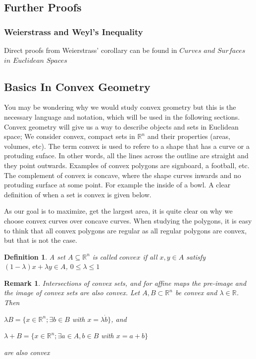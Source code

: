 \documentclass[a4paper]{book}
\newtheorem{remark}{Remark}%
\newtheorem{definition}{Definition}%
\begin{document}
\subsection{Further Proofs}
\subsubsection{Weierstrass and Weyl's Inequality}
Direct proofs from Weierstrass' corollary can be found in $Curves$ $and$ $Surfaces$ $in$ $Euclidean$ $Spaces$~\cite{chern1966curves}

\subsection{Basics In Convex Geometry}
You may be wondering why we would study convex geometry but this is the necessary language and notation, which will be used in the following sections. Convex geometry will give us a way to describe objects and sets in Euclidean space; We consider convex, compact sets in $\mathbb{R}^n$ and their properties (areas, volumes, etc). The term convex is used to refere to a shape that has a curve or a protuding suface. In other words, all the lines across the outline are straight and they point outwards. Examples of convex polygons are signboard, a football, etc. The complement of convex is concave, where the shape curves inwards and no protuding surface at some point. For example the inside of a bowl. A clear definition of when a set is convex is given below. 

As our goal is to maximize, get the largest area, it is quite clear on why we choose convex curves over concave curves. When studying the polygons, it is easy to think that all convex polygons are regular as all regular polygons are convex, but that is not the case.
\newline

\begin{definition}
	A set $A\subseteq\mathbb{R}^n$ is called $convex$ if all $x,y\in A$ satisfy $(1-\lambda)x+\lambda y\in A$, $0\leq\lambda\leq1$
\end{definition}

\begin{remark}
	Intersections of convex sets, and for affine maps the pre-image and the image of convex sets are also convex. Let $A, B \subset\mathbb{R}^n$ be convex and $\lambda\in\mathbb{R}$. Then
	\begin{center}
		$\lambda B=\{x\in\mathbb{R}^n;\exists b\in B$ with $x=\lambda\dot b\}$, and
	
		$\lambda+B=\{x\in\mathbb{R}^n;\exists a\in A, b\in B$ with $x=a+b\}$
	\end{center}
	are also convex
\end{remark}
\end{document}
